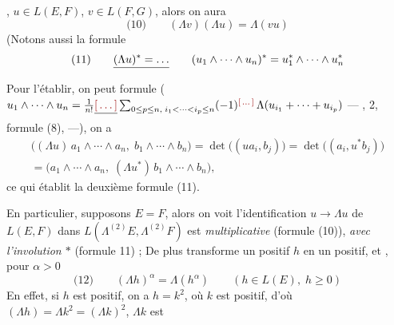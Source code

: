 \documentclass[11pt,a4paper]{article}
\begin{document}
   ,  $u \in L(E,F)$, $v \in L(F,G)$, alors on aura
\[
  \text{(10)}\qquad (\Lambda v)(\Lambda u) = \Lambda(vu)
\]
(Notons aussi la formule
\[
  \text{(11)}\qquad \struck{(\Lambda u)^{*} = \ldots}\qquad (u_1 \wedge \cdots \wedge u_n)^{*} = u_1^{*} \wedge \cdots \wedge u_n^{*}
\]
Pour l'établir, on peut  \struck{\ill{}}  \ill{} formule ( $u_1 \wedge \cdots \wedge u_n = \frac{1}{n!} \struck{\ill{}} \sum_{0 \leq p \leq n,\; i_1 < \cdots < i_p \leq n} (-1)^{\ill{}}\, \Lambda(u_{i_1} + \cdots + u_{i_p})$  ---  , 2, formule (8), ---), on a \ill{}
\begin{gather}
  \bigl((\Lambda u)\, a_1 \wedge \cdots \wedge a_n,\; b_1 \wedge \cdots \wedge b_n\bigr) = \det\bigl((u a_i, b_j)\bigr) = \det\bigl((a_i, u^{*} b_j)\bigr) \\
  = \bigl(a_1 \wedge \cdots \wedge a_n,\; (\Lambda u^{*})\, b_1 \wedge \cdots \wedge b_n\bigr),
\end{gather}
ce qui établit la deuxième formule (11).

En particulier, supposons $E = F$, alors on voit  l'identification $u \to \Lambda u$ de $L(E,F)$ dans $L(\Lambda^{(2)} E, \Lambda^{(2)} F)$ est \emph{multiplicative} (formule (10)),  \emph{avec l'involution $*$} (formule 11)  ;  De plus  transforme un  positif $h$ en un  positif, et  , pour \struck{\ill{}}  $\alpha > 0$
\[
  \text{(12)}\qquad (\Lambda h)^{\alpha} = \Lambda(h^{\alpha}) \qquad (h \in L(E),\; h \geq 0)
\]
En effet, si $h$ est positif, on a $h = k^{2}$, où $k$ est  positif, d'où $(\Lambda h) = \Lambda k^{2} = (\Lambda k)^{2}$,  $\Lambda k$ est  
\end{document}
